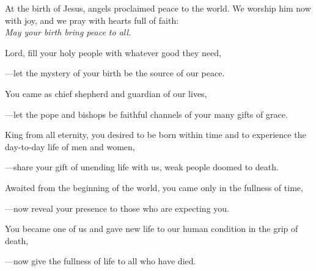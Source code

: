 \intercessions\indent

\begin{hangpar}

At the birth of Jesus, angels proclaimed peace to the world. We worship him now with joy, and we pray with hearts full of faith:\\
\emph{May your birth bring peace to all.}

\medskip Lord, fill your holy people with whatever good they need,

{\color{red}---\thinspace}let the mystery of your birth be the source of our peace.

\medskip You came as chief shepherd and guardian of our lives,

{\color{red}---\thinspace}let the pope and bishops be faithful channels of your many gifts of grace.

\medskip King from all eternity, you desired to be born within time and to experience the day-to-day life of men and women,

{\color{red}---\thinspace}share your gift of unending life with us, weak people doomed to death.

\medskip Awaited from the beginning of the world, you came only in the fullness of time,

{\color{red}---\thinspace}now reveal your presence to those who are expecting you.

\medskip You became one of us and gave new life to our human condition in the grip of death,

{\color{red}---\thinspace}now give the fullness of life to all who have died.

\medskip

\end{hangpar}